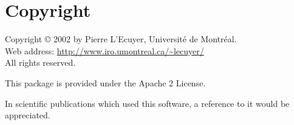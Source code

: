\section*{Copyright}
 
  Copyright \copyright {} 2002 by Pierre L'Ecuyer,
    Universit\'e de Montr\'eal.\\
  Web address:   \url{http://www.iro.umontreal.ca/~lecuyer/} \\
  All rights reserved.
 
\noindent  This package is provided under the Apache 2 License.
 
\noindent  In scientific publications which used this software, a reference to it
  would be appreciated.
